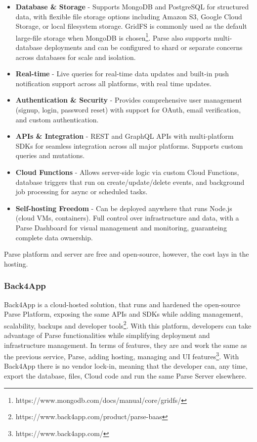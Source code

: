 \begin{itemize}
	\item \textbf{Database \& Storage} - Supports MongoDB and PostgreSQL for structured data, with flexible file storage options including Amazon S3, Google Cloud Storage, or local filesystem storage. GridFS is commonly used as the default large-file storage when MongoDB is chosen\footnote{https://www.mongodb.com/docs/manual/core/gridfs/}. Parse also supports multi-database deployments and can be configured to shard or separate concerns across databases for scale and isolation.
	\item \textbf{Real-time} - Live queries for real-time data updates and built-in push notification support across all platforms, with real time updates.
	\item \textbf{Authentication \& Security} - Provides comprehensive user management (signup, login, password reset) with support for OAuth, email verification, and custom authentication.
	\item \textbf{APIs \& Integration} - REST and GraphQL APIs with multi-platform SDKs for seamless integration across all major platforms. Supports custom queries and mutations.
	\item \textbf{Cloud Functions} - Allows server-side logic via custom Cloud Functions, database triggers that run on create/update/delete events, and background job processing for async or scheduled tasks.
	\item \textbf{Self-hosting Freedom} - Can be deployed anywhere that runs Node.js (cloud VMs, containers). Full control over infrastructure and data, with a Parse Dashboard for visual management and monitoring, guaranteing complete data ownership.
\end{itemize}

Parse platform and server are free and open-source, however, the cost lays in the hosting.

\subsubsection{\textbf{Back4App}}

Back4App is a cloud-hosted solution, that runs and hardened the open-source Parse Platform, exposing the same APIs and SDKs while adding management, scalability, backups and developer tools\footnote{https://www.back4app.com/product/parse-baas}. With this platform, developers can take advantage of Parse functionalities while simplifying deployment and infrastructure management. In terms of features, they are and work the same as the previous service, Parse, adding hosting, managing and UI features\footnote{https://www.back4app.com/}. With Back4App there is no vendor lock-in, meaning that the developer can, any time, export the database, files, Cloud code and run the same Parse Server elsewhere\cite{Back4AppAlternatives}.

